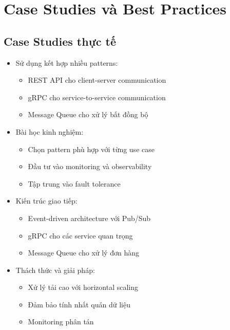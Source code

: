 \section{Case Studies và Best Practices}

\subsection{Case Studies thực tế}
\begin{itemize}
    \item Sử dụng kết hợp nhiều patterns:
    \begin{itemize}
        \item REST API cho client-server communication
        \item gRPC cho service-to-service communication
        \item Message Queue cho xử lý bất đồng bộ
    \end{itemize}
    \item Bài học kinh nghiệm:
    \begin{itemize}
        \item Chọn pattern phù hợp với từng use case
        \item Đầu tư vào monitoring và observability
        \item Tập trung vào fault tolerance
    \end{itemize}
\end{itemize}

\begin{itemize}
    \item Kiến trúc giao tiếp:
    \begin{itemize}
        \item Event-driven architecture với Pub/Sub
        \item gRPC cho các service quan trọng
        \item Message Queue cho xử lý đơn hàng
    \end{itemize}
    \item Thách thức và giải pháp:
    \begin{itemize}
        \item Xử lý tải cao với horizontal scaling
        \item Đảm bảo tính nhất quán dữ liệu
        \item Monitoring phân tán
    \end{itemize}
\end{itemize}

